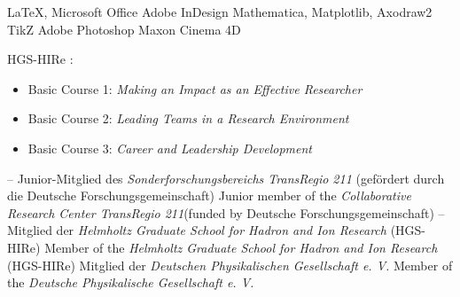 \documentclass[color=TUDa-1b]{komacv}
\begin{document}
\cvitem%
	{}%
	{\LaTeX, Microsoft Office Adobe InDesign}
\cvitem%
	{}%
	{Mathematica, Matplotlib, Axodraw2 TikZ}
\cvitem%
	{}%
	{Adobe Photoshop Maxon Cinema 4D}
\cvitem%
	{}%
	{%
		HGS-HIRe :\newline
		\begin{itemize}
		\setlength\itemsep{-.1em}
			\item Basic Course 1: \textit{Making an Impact as an Effective Researcher}
			\item Basic Course 2: \textit{Leading Teams in a Research Environment}
			\item Basic Course 3: \textit{Career and Leadership Development}
		\end{itemize}
	}

\cvitem%
	{}%
	{}

\clearpage

\cvitem%
	{--}%
	{\lang%
		{Junior-Mitglied des \textit{Sonderforschungsbereichs TransRegio 211} \newline (gefördert durch die Deutsche Forschungsgemeinschaft)}%
		{Junior member of the \textit{Collaborative Research Center TransRegio 211}\newline (funded by Deutsche Forschungsgemeinschaft)}
	}
\cvitem%
	{--}%
	{\lang%
		{Mitglied der \textit{Helmholtz Graduate School for Hadron and Ion Research} (HGS-HIRe)}
		{Member of the \textit{Helmholtz Graduate School for Hadron and Ion Research} (HGS-HIRe)}
	}
\cvitem%
	{ }%
	{\lang%
		{Mitglied der \textit{Deutschen Physikalischen Gesellschaft e. V.}}%
		{Member of the \textit{Deutsche Physikalische Gesellschaft e. V.}}
	}
\end{document}
